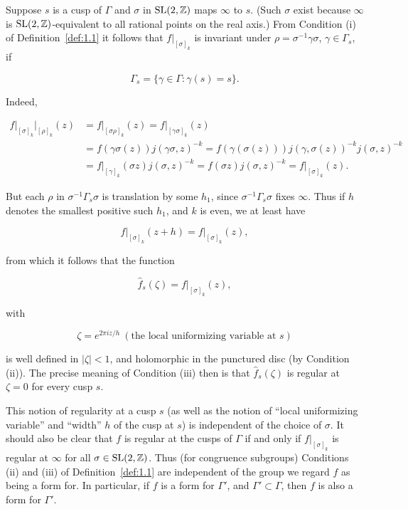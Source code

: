 \begin{remark}\label{rem:1.2}

Suppose $s$ is a cusp of $\Gamma$ and $\sigma$ in $\operatorname{SL}(2,\mathbb{Z})$ maps $\infty$ to $s$. (Such $\sigma$ exist because $\infty$ is $\operatorname{SL}(2,\mathbb{Z})$-equivalent to all rational points on the real axis.) From Condition (i) of Definition~\ref{def:1.1} it follows that $f|_{[\sigma]_k}$ is invariant under $\rho = \sigma^{-1}\gamma\sigma$, $\gamma \in \Gamma_s$, if

\[
\Gamma_s = \{\gamma \in \Gamma : \gamma(s) = s\}.
\]

Indeed,

\[
\begin{aligned}
f\big|_{[\sigma]_k}\big|_{[\rho]_k}(z) &= f\big|_{[\sigma\rho]_k}(z) = f\big|_{[\gamma\sigma]_k}(z)\\
&= f(\gamma\sigma(z)) j(\gamma\sigma, z)^{-k} = f(\gamma(\sigma(z))) j(\gamma, \sigma(z))^{-k} j(\sigma, z)^{-k}\\
&= f\big|_{[\gamma]_k}(\sigma z) j(\sigma, z)^{-k} = f(\sigma z) j(\sigma, z)^{-k} = f\big|_{[\sigma]_k}(z).
\end{aligned}
\]

But each $\rho$ in $\sigma^{-1}\Gamma_s\sigma$ is translation by some $h_1$, since $\sigma^{-1}\Gamma_s\sigma$ fixes $\infty$. Thus if $h$ denotes the smallest positive such $h_1$, and $k$ is even, we at least have

\[
f\big|_{[\sigma]_k}(z + h) = f\big|_{[\sigma]_k}(z),
\]

from which it follows that the function

\begin{equation}\label{eq:1.4}
\hat{f}_s(\zeta) = f\big|_{[\sigma]_k}(z),\tag{1.4}
\end{equation}

with

\begin{equation}\label{eq:1.5}
\zeta = e^{2\pi iz/h} \ (\text{the local uniformizing variable at } s)\tag{1.5}
\end{equation}

is well defined in $|\zeta| < 1$, and holomorphic in the punctured disc (by Condition (ii)). The precise meaning of Condition (iii) then is that $\hat{f}_s(\zeta)$ is regular at $\zeta = 0$ for every cusp $s$.

This notion of regularity at a cusp $s$ (as well as the notion of ``local uniformizing variable'' and ``width'' $h$ of the cusp at $s$) is independent of the choice of $\sigma$. It should also be clear that $f$ is regular at the cusps of $\Gamma$ if and only if $f|_{[\sigma]_k}$ is regular at $\infty$ for all $\sigma \in \operatorname{SL}(2,\mathbb{Z})$. Thus (for congruence subgroups) Conditions (ii) and (iii) of Definition~\ref{def:1.1} are independent of the group we regard $f$ as being a form for. In particular, if $f$ is a form for $\Gamma'$, and $\Gamma' \subset \Gamma$, then $f$ is also a form for $\Gamma'$.

\end{remark}

